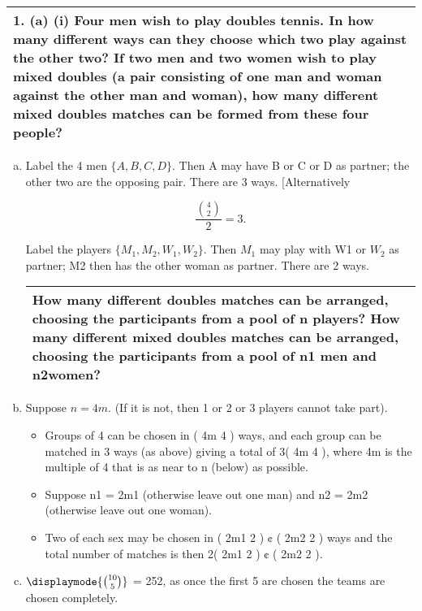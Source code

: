 \documentclass[a4paper,12pt]{article}
\begin{document}
\begin{table}[ht!]
     \centering
     \begin{tabular}{|p{15cm}|}
     \hline        
1. (a) (i) Four men wish to play doubles tennis.  In how many different ways can they choose which two play against the other two?
If two men and two women wish to play mixed doubles (a pair consisting of one man and woman against the other man and woman), how many different mixed doubles matches can be formed from these four people?
\\ \hline
      \end{tabular}
    \end{table}
    

    


\begin{enumerate}[(a)]
\item  Label the 4 men $\{A,B,C,D\}$. Then A may have B or C or D as partner; the
other two are the opposing pair. There are 3 ways. [Alternatively

\[ \frac{{ 4 \choose 2}}{2} = 3.\] 

Label the players $\{M_1,M_2,W_1,W_2\}$. Then $M_1$ may play with W1 or $W_2$ as
partner; M2 then has the other woman as partner. There are 2 ways.

  \begin{table}[ht!]
     \centering
     \begin{tabular}{|p{15cm}|}
     \hline   How many different doubles matches can be arranged, choosing the participants from a pool of n players?
How many different mixed doubles matches can be arranged, choosing the participants from a pool of n1 men and n2women?

\\ \hline
      \end{tabular}
    \end{table}
\item Suppose $n = 4m$. (If it is not, then 1 or 2 or 3 players cannot take part).
\begin{itemize}
\item Groups of 4 can be chosen in ( 4m
4 ) ways, and each group can be matched
in 3 ways (as above) giving a total of 3( 4m
4 ), where 4m is the multiple of 4
that is as near to n (below) as possible.
\item Suppose n1 = 2m1 (otherwise leave out one man) and n2 = 2m2 (otherwise
leave out one woman).
\item Two of each sex may be chosen in ( 2m1
2 ) ¢ ( 2m2
2 ) ways and the total number
of matches is then 2( 2m1
2 ) ¢ ( 2m2
2 ).
\end{itemize}
\item $\displaymode{ {10 \choose 5}}$ = 252, as once the first 5 are chosen the teams are chosen completely.


\end{enumerate}
\end{document}
